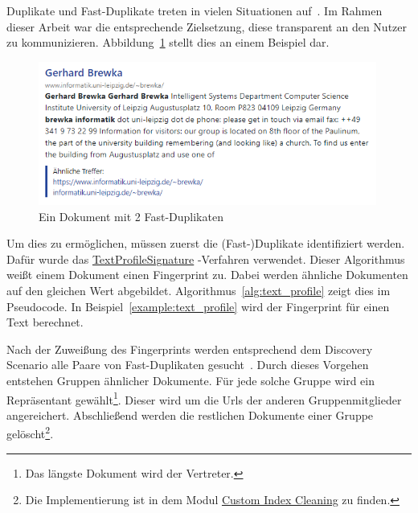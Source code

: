 Duplikate und Fast-Duplikate treten in vielen Situationen auf~\cite{croft.chap3}.
Im Rahmen dieser Arbeit war die entsprechende Zielsetzung, diese transparent an den Nutzer zu kommunizieren.
Abbildung~\ref{fig:grouped_sim} stellt dies an einem Beispiel dar.

\begin{figure}[!ht]
	\includegraphics[width=0.99\textwidth]{chapter_data_aqcuisition/grouped_duplicates.png}
	\caption{Ein Dokument mit 2 Fast-Duplikaten}
	\label{fig:grouped_sim}
\end{figure}



Um dies zu ermöglichen, müssen zuerst die (Fast-)Duplikate identifiziert werden.
Dafür wurde das
\href{https://github.com/apache/nutch/blob/master/src/java/org/apache/nutch/crawl/TextProfileSignature.java}{TextProfileSignature}
-Verfahren verwendet.
Dieser Algorithmus weißt einem Dokument einen Fingerprint zu.
Dabei werden ähnliche Dokumenten auf den gleichen Wert abgebildet.
Algorithmus~\ref{alg:text_profile} zeigt dies im Pseudocode.
In Beispiel~\ref{example:text_profile} wird der Fingerprint für einen Text berechnet.

Nach der Zuweißung des Fingerprints werden entsprechend dem Discovery Scenario alle Paare von Fast-Duplikaten
gesucht~\cite{croft.chap3}. Durch dieses Vorgehen entstehen Gruppen ähnlicher Dokumente.
Für jede solche Gruppe wird ein Repräsentant gewählt\footnote{Das längste Dokument wird der Vertreter.}.
Dieser wird um die Urls der anderen Gruppenmitglieder angereichert.
Abschließend werden die restlichen Dokumente einer Gruppe gelöscht\footnote{Die Implementierung ist in dem Modul 
\href{https://github.com/mam10eks/search-homepage-of-university-leipzig/tree/master/custom-index-cleaning}
{Custom Index Cleaning} zu finden.}.

\newpage

